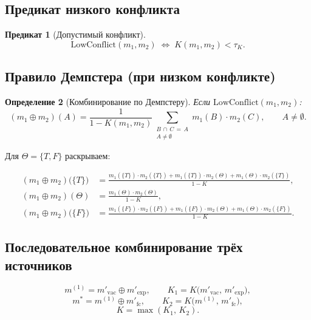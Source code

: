 \documentclass[12pt,a4paper]{article}
\newtheorem{definition}{Определение}
\newtheorem{predicate}[definition]{Предикат}
\begin{document}
\subsection{Предикат низкого конфликта}

\begin{predicate}[Допустимый конфликт]
  \[
    \mathrm{LowConflict}(m_1, m_2)
      \;\Longleftrightarrow\;
      K(m_1, m_2) < \tau_K.
  \]
\end{predicate}

\subsection{Правило Демпстера (при низком конфликте)}

\begin{definition}[Комбинирование по Демпстеру]
  Если $\mathrm{LowConflict}(m_1, m_2)$:
  \[
    (m_1 \oplus m_2)(A)
      = \frac{1}{1 - K(m_1, m_2)}
        \sum_{\substack{B \,\cap\, C \,=\, A \\ A \neq \emptyset}}
          m_1(B) \cdot m_2(C),
    \qquad A \neq \emptyset.
  \]
\end{definition}

Для $\Theta = \{T, F\}$ раскрываем:

\begin{align}
  (m_1 \oplus m_2)\!\bigl(\{T\}\bigr)
    &= \frac{
        m_1(\{T\}) \cdot m_2(\{T\})
        + m_1(\{T\}) \cdot m_2(\Theta)
        + m_1(\Theta) \cdot m_2(\{T\})
      }{1 - K},
    \label{eq:comb_T} \\[8pt]
  (m_1 \oplus m_2)(\Theta)
    &= \frac{m_1(\Theta) \cdot m_2(\Theta)}{1 - K},
    \label{eq:comb_U} \\[8pt]
  (m_1 \oplus m_2)\!\bigl(\{F\}\bigr)
    &= \frac{
        m_1(\{F\}) \cdot m_2(\{F\})
        + m_1(\{F\}) \cdot m_2(\Theta)
        + m_1(\Theta) \cdot m_2(\{F\})
      }{1 - K}.
    \label{eq:comb_F}
\end{align}

\subsection{Последовательное комбинирование трёх источников}

\[
  m^{(1)} = m'_{\mathrm{vac}} \oplus m'_{\mathrm{exp}},
  \qquad
  K_1 = K\!\bigl(m'_{\mathrm{vac}},\, m'_{\mathrm{exp}}\bigr),
\]
\[
  m^* = m^{(1)} \oplus m'_{\mathrm{fc}},
  \qquad
  K_2 = K\!\bigl(m^{(1)},\, m'_{\mathrm{fc}}\bigr),
\]
\[
  K = \max(K_1,\, K_2).
\]
\end{document}
